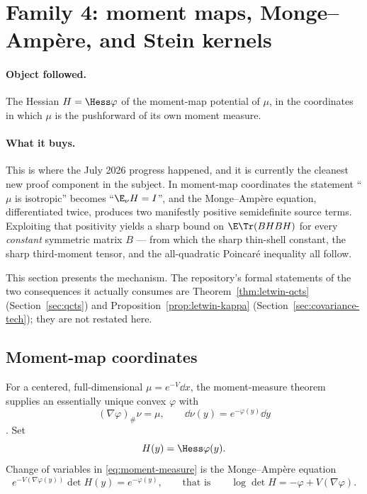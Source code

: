\documentclass[../../main.tex]{subfiles}
\begin{document}
\section{Family 4: moment maps, Monge--Amp\`ere, and Stein kernels}
\label{sec:family-moment-map}

\paragraph{Object followed.}
The Hessian $H=\Hess\varphi$ of the moment-map potential of $\mu$, in the coordinates in which
$\mu$ is the pushforward of its own moment measure.

\paragraph{What it buys.}
This is where the July 2026 progress happened, and it is currently the cleanest new proof
component in the subject. In moment-map coordinates the statement ``$\mu$ is isotropic'' becomes
``$\E_\nu H=I$'', and the Monge--Amp\`ere equation, differentiated twice, produces two
manifestly positive semidefinite source terms. Exploiting that positivity yields a sharp bound on
$\E\Tr(BHBH)$ for every \emph{constant} symmetric matrix $B$ --- from which the sharp thin-shell
constant, the sharp third-moment tensor, and the all-quadratic Poincar\'e inequality all follow.

This section presents the mechanism. The repository's formal statements of the two consequences it
actually consumes are Theorem~\ref{thm:letwin-qcts} (Section~\ref{sec:qcts}) and
Proposition~\ref{prop:letwin-kappa} (Section~\ref{sec:covariance-tech}); they are not restated
here.

\subsection{Moment-map coordinates}
\label{subsec:mm-coordinates}

For a centered, full-dimensional $\mu=e^{-V}\dd x$, the moment-measure theorem supplies an
essentially unique convex $\varphi$ with
\begin{equation}
  (\nabla\varphi)_\#\nu=\mu,
  \qquad
  \dd\nu(y)=e^{-\varphi(y)}\dd y
  \label{eq:moment-measure}
\end{equation}
\cite{CorderoErausquinKlartag2015MomentMeasures,Klartag2013MomentMeasures}. Set
\[
  H(y)=\Hess\varphi(y).
\]
Change of variables in \eqref{eq:moment-measure} is the Monge--Amp\`ere equation
\begin{equation}
  e^{-V(\nabla\varphi(y))}\det H(y)=e^{-\varphi(y)},
  \qquad\text{that is}\qquad
  \log\det H=-\varphi+V(\nabla\varphi).
  \label{eq:MA}
\end{equation}
\end{document}
